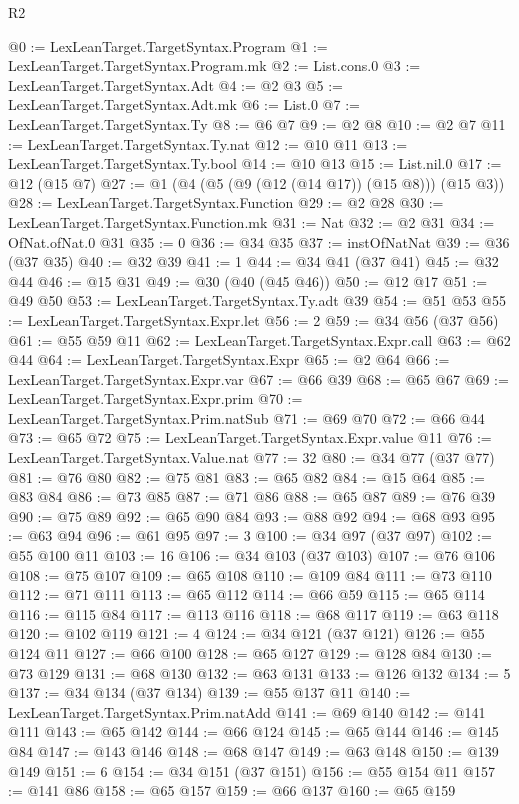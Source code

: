 \begin{lexlean}{R2}
\begin{coremodule}
@0 := LexLeanTarget.TargetSyntax.Program
@1 := LexLeanTarget.TargetSyntax.Program.mk
@2 := List.cons.{0}
@3 := LexLeanTarget.TargetSyntax.Adt
@4 := @2 @3
@5 := LexLeanTarget.TargetSyntax.Adt.mk
@6 := List.{0}
@7 := LexLeanTarget.TargetSyntax.Ty
@8 := @6 @7
@9 := @2 @8
@10 := @2 @7
@11 := LexLeanTarget.TargetSyntax.Ty.nat
@12 := @10 @11
@13 := LexLeanTarget.TargetSyntax.Ty.bool
@14 := @10 @13
@15 := List.nil.{0}
@17 := @12 (@15 @7)
@27 := @1 (@4 (@5 (@9 (@12 (@14 @17)) (@15 @8))) (@15 @3))
@28 := LexLeanTarget.TargetSyntax.Function
@29 := @2 @28
@30 := LexLeanTarget.TargetSyntax.Function.mk
@31 := Nat
@32 := @2 @31
@34 := OfNat.ofNat.{0} @31
@35 := 0
@36 := @34 @35
@37 := instOfNatNat
@39 := @36 (@37 @35)
@40 := @32 @39
@41 := 1
@44 := @34 @41 (@37 @41)
@45 := @32 @44
@46 := @15 @31
@49 := @30 (@40 (@45 @46))
@50 := @12 @17
@51 := @49 @50
@53 := LexLeanTarget.TargetSyntax.Ty.adt @39
@54 := @51 @53
@55 := LexLeanTarget.TargetSyntax.Expr.let
@56 := 2
@59 := @34 @56 (@37 @56)
@61 := @55 @59 @11
@62 := LexLeanTarget.TargetSyntax.Expr.call
@63 := @62 @44
@64 := LexLeanTarget.TargetSyntax.Expr
@65 := @2 @64
@66 := LexLeanTarget.TargetSyntax.Expr.var
@67 := @66 @39
@68 := @65 @67
@69 := LexLeanTarget.TargetSyntax.Expr.prim
@70 := LexLeanTarget.TargetSyntax.Prim.natSub
@71 := @69 @70
@72 := @66 @44
@73 := @65 @72
@75 := LexLeanTarget.TargetSyntax.Expr.value @11
@76 := LexLeanTarget.TargetSyntax.Value.nat
@77 := 32
@80 := @34 @77 (@37 @77)
@81 := @76 @80
@82 := @75 @81
@83 := @65 @82
@84 := @15 @64
@85 := @83 @84
@86 := @73 @85
@87 := @71 @86
@88 := @65 @87
@89 := @76 @39
@90 := @75 @89
@92 := @65 @90 @84
@93 := @88 @92
@94 := @68 @93
@95 := @63 @94
@96 := @61 @95
@97 := 3
@100 := @34 @97 (@37 @97)
@102 := @55 @100 @11
@103 := 16
@106 := @34 @103 (@37 @103)
@107 := @76 @106
@108 := @75 @107
@109 := @65 @108
@110 := @109 @84
@111 := @73 @110
@112 := @71 @111
@113 := @65 @112
@114 := @66 @59
@115 := @65 @114
@116 := @115 @84
@117 := @113 @116
@118 := @68 @117
@119 := @63 @118
@120 := @102 @119
@121 := 4
@124 := @34 @121 (@37 @121)
@126 := @55 @124 @11
@127 := @66 @100
@128 := @65 @127
@129 := @128 @84
@130 := @73 @129
@131 := @68 @130
@132 := @63 @131
@133 := @126 @132
@134 := 5
@137 := @34 @134 (@37 @134)
@139 := @55 @137 @11
@140 := LexLeanTarget.TargetSyntax.Prim.natAdd
@141 := @69 @140
@142 := @141 @111
@143 := @65 @142
@144 := @66 @124
@145 := @65 @144
@146 := @145 @84
@147 := @143 @146
@148 := @68 @147
@149 := @63 @148
@150 := @139 @149
@151 := 6
@154 := @34 @151 (@37 @151)
@156 := @55 @154 @11
@157 := @141 @86
@158 := @65 @157
@159 := @66 @137
@160 := @65 @159

\end{coremodule}
\end{lexlean}
